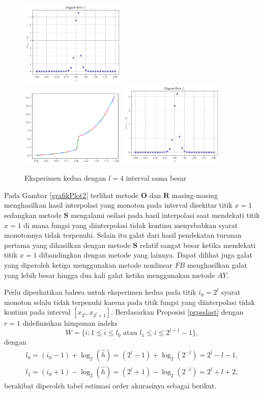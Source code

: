 \begin{figure}[H]
    \includegraphics[width=5cm]{Images/figure_2/plotRFB2.png}
    \\
    \includegraphics[width=5cm]{Images/figure_2/grafikRAY2.png}
    \includegraphics[width=5cm]{Images/figure_2/plotRAY2.png}
    \caption{Eksperimen kedua dengan $l=4$ interval sama besar}
    \label{grafikPlot2}
\end{figure}

    Pada Gambar \eqref{grafikPlot2} terlihat metode $\textbf{O}$ dan $\textbf{R}$ masing-masing menghasilkan hasil interpolasi yang monoton pada interval disekitar titik $x=1$ sedangkan metode $\textbf{S}$ mengalami osilasi pada hasil interpolasi saat mendekati titik $x=1$ di mana fungsi yang diinterpolasi tidak kontinu menyebabkan syarat monotonnya tidak terpenuhi. Selain itu galat dari hasil pendekatan turunan pertama yang dihasilkan dengan metode $\textbf{S}$ relatif sangat besar ketika mendekati titik $x=1$ dibandingkan dengan metode yang lainnya. Dapat dilihat juga galat yang diperoleh ketiga menggunakan metode nonlinear $FB$ menghasilkan galat yang lebih besar hingga dua kali galat ketika menggunakan metode $AY$.

    Perlu diperhatikan bahwa untuk eksperimen kedua pada titik $i_0 = 2^l$ syarat monoton selalu tidak terpenuhi karena pada titik fungsi yang diinterpolasi tidak kontinu pada interval $[x_{2^{l}}, x_{2^l + 1}]$. Berdasarkan Proposisi \ref{prpsslast} dengan $r=1$ didefinisikan himpunan indeks
    $$W=\{ i : 1\leq i \leq l_0 \text{ atau } l_1 \leq i \leq 2^{l+1} - 1\},$$ 
    dengan
    \begin{align*}
        l_0 = (i_0 - 1) + \log_2(\hat{h}) = (2^l - 1) + \log_2(2^{-l}) = 2^l - l - 1,\\
        l_1 = (i_0 + 1) - \log_2(\hat{h}) = (2^l + 1) - \log_2(2^{-l}) = 2^l + l + 2,
    \end{align*}
    berakibat diperoleh tabel estimasi order akurasinya sebagai berikut.

